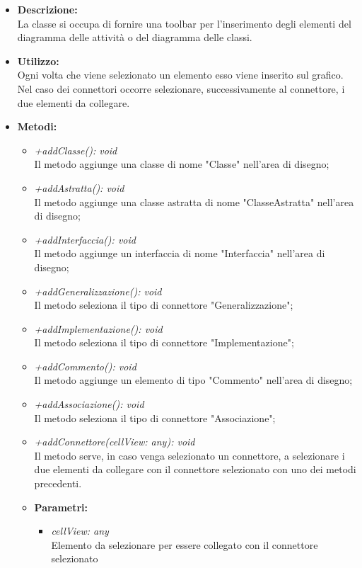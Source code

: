 				\begin{itemize}
          			\item \textbf{Descrizione:}\\
          			La classe si occupa di fornire una toolbar per l'inserimento degli elementi del diagramma delle attività o del diagramma delle classi.
          			\item \textbf{Utilizzo:}\\
          			Ogni volta che viene selezionato un elemento esso viene inserito sul grafico. Nel caso dei connettori occorre selezionare, successivamente al connettore, i due elementi da collegare.
          			\item \textbf{Metodi:}\\
          			\begin{itemize}
          				\item \emph{+addClasse(): void}\\
          				Il metodo aggiunge una classe di nome "Classe" nell'area di disegno;
          				\item \emph{+addAstratta(): void}\\
          				Il metodo aggiunge una classe astratta di nome "ClasseAstratta" nell'area di disegno;
          				\item \emph{+addInterfaccia(): void}\\
          				Il metodo aggiunge un interfaccia di nome "Interfaccia" nell'area di disegno;
          				\item \emph{+addGeneralizzazione(): void}\\
          				Il metodo seleziona il tipo di connettore "Generalizzazione";
          				\item \emph{+addImplementazione(): void}\\
          				Il metodo seleziona il tipo di connettore "Implementazione";
          				\item \emph{+addCommento(): void}\\
          				Il metodo aggiunge un elemento di tipo "Commento" nell'area di disegno;
          				\item \emph{+addAssociazione(): void}\\
          				Il metodo seleziona il tipo di connettore "Associazione";
          				\item \emph{+addConnettore(cellView: any): void}\\
          				Il metodo serve, in caso venga selezionato un connettore, a selezionare i due elementi da collegare con il connettore selezionato con uno dei metodi precedenti.
          				\item \textbf{Parametri:}\\
            				\begin{itemize}
            					\item \emph{cellView: any}\\
            					Elemento da selezionare per essere collegato con il connettore selezionato
            				\end{itemize}
          			\end{itemize}
          		\end{itemize}
